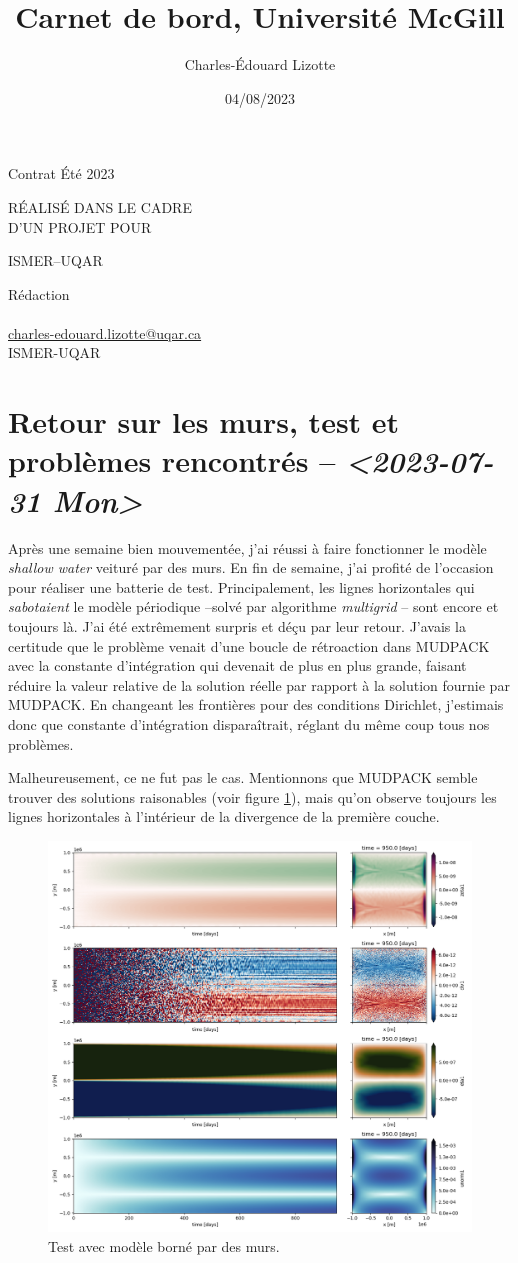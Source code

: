 \documentclass[10pt]{article}
\author{Charles-Édouard Lizotte}
\date{04/08/2023}
\title{Carnet de bord, Université McGill}
\makeatletter
\numberwithin{equation}{section}
\newcommand{\mytitlepage}{
\begin{titlepage}
\begin{center}
{\Large Contrat Été 2023 \par}
\vspace{2cm}
{\Large \MakeUppercase{\thetitle} \par}
\vspace{2cm}
RÉALISÉ DANS LE CADRE\\ D'UN PROJET POUR \par
\vspace{2cm}
{\Large ISMER--UQAR \par}
\vspace{2cm}
{\thedate}
\end{center}
\vfill
Rédaction \\
{\theauthor}\\
\url{charles-edouard.lizotte@uqar.ca}\\
ISMER-UQAR
\end{titlepage}
}
\makeatother
\begin{document}
\mytitlepage
\tableofcontents\newpage


\section{Retour sur les murs, test et problèmes rencontrés -- \textit{<2023-07-31 Mon>}}
\label{sec:orgdabaf2a}

Après une semaine bien mouvementée, j'ai réussi à faire fonctionner le modèle \emph{shallow water} veituré par des murs.
En fin de semaine, j'ai profité de l'occasion pour réaliser une batterie de test.
Principalement, les lignes horizontales qui \emph{sabotaient} le modèle périodique --solvé par algorithme \emph{multigrid} -- sont encore et toujours là.
J'ai été extrêmement surpris et déçu par leur retour.
J'avais la certitude que le problème venait d'une boucle de rétroaction dans MUDPACK avec la constante d'intégration qui devenait de plus en plus grande, faisant réduire la valeur relative de la solution réelle par rapport à la solution fournie par MUDPACK.
En changeant les frontières pour des conditions Dirichlet, j'estimais donc que constante d'intégration disparaîtrait, réglant du même coup tous nos problèmes.\bigskip

Malheureusement, ce ne fut pas le cas.
Mentionnons que MUDPACK semble trouver des solutions raisonables (voir figure \ref{fig:org0509ad8}), mais qu'on observe toujours les lignes horizontales à l'intérieur de la divergence de la première couche.

\begin{figure}[htbp]
\centering
\includegraphics[width=.9\linewidth]{figures/tests/2023-07-31_hovmoller1_t=950days.png}
\caption{\label{fig:org0509ad8}Test avec modèle borné par des murs.}
\end{figure}
\newpage
\end{document}
